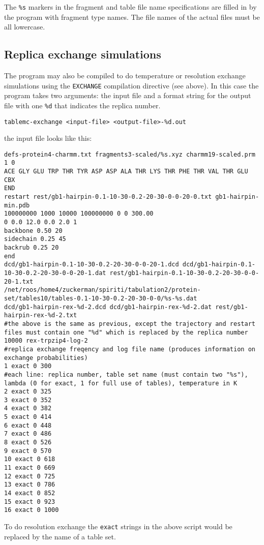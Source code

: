 \documentclass{article}      %
\begin{document}
The \verb+%s+ markers in the fragment and table file name specifications are filled in by the program with fragment type names.  The file names of the actual files must be all lowercase. 

\subsection{Replica exchange simulations}

The program may also be compiled to do temperature or resolution exchange simulations using the \verb+EXCHANGE+ compilation directive (see above).  In this case the program takes two arguments: the input file and a format string for the output file with one \verb+%d+ that indicates the replica number.
\begin{verbatim}
tablemc-exchange <input-file> <output-file>-%d.out
\end{verbatim}

the input file looks like this:
\begin{lstlisting}
defs-protein4-charmm.txt fragments3-scaled/%s.xyz charmm19-scaled.prm 1 0
ACE GLY GLU TRP THR TYR ASP ASP ALA THR LYS THR PHE THR VAL THR GLU CBX
END
restart rest/gb1-hairpin-0.1-10-30-0.2-20-30-0-0-20-0.txt gb1-hairpin-min.pdb
100000000 1000 10000 100000000 0 0 300.00
0 0.0 12.0 0.0 2.0 1
backbone 0.50 20
sidechain 0.25 45
backrub 0.25 20
end
dcd/gb1-hairpin-0.1-10-30-0.2-20-30-0-0-20-1.dcd dcd/gb1-hairpin-0.1-10-30-0.2-20-30-0-0-20-1.dat rest/gb1-hairpin-0.1-10-30-0.2-20-30-0-0-20-1.txt
/net/roos/home4/zuckerman/spiriti/tabulation2/protein-set/tables10/tables-0.1-10-30-0.2-20-30-0-0/%s-%s.dat
dcd/gb1-hairpin-rex-%d-2.dcd dcd/gb1-hairpin-rex-%d-2.dat rest/gb1-hairpin-rex-%d-2.txt
#the above is the same as previous, except the trajectory and restart files must contain one "%d" which is replaced by the replica number
10000 rex-trpzip4-log-2
#replica exchange freqency and log file name (produces information on exchange probabilities)
1 exact 0 300
#each line: replica number, table set name (must contain two "%s"), lambda (0 for exact, 1 for full use of tables), temperature in K
2 exact 0 325
3 exact 0 352
4 exact 0 382
5 exact 0 414
6 exact 0 448
7 exact 0 486
8 exact 0 526
9 exact 0 570
10 exact 0 618
11 exact 0 669
12 exact 0 725
13 exact 0 786
14 exact 0 852
15 exact 0 923
16 exact 0 1000
\end{lstlisting}

To do resolution exchange the \verb+exact+ strings in the above script would be replaced by the name of a table set.
\end{document}
